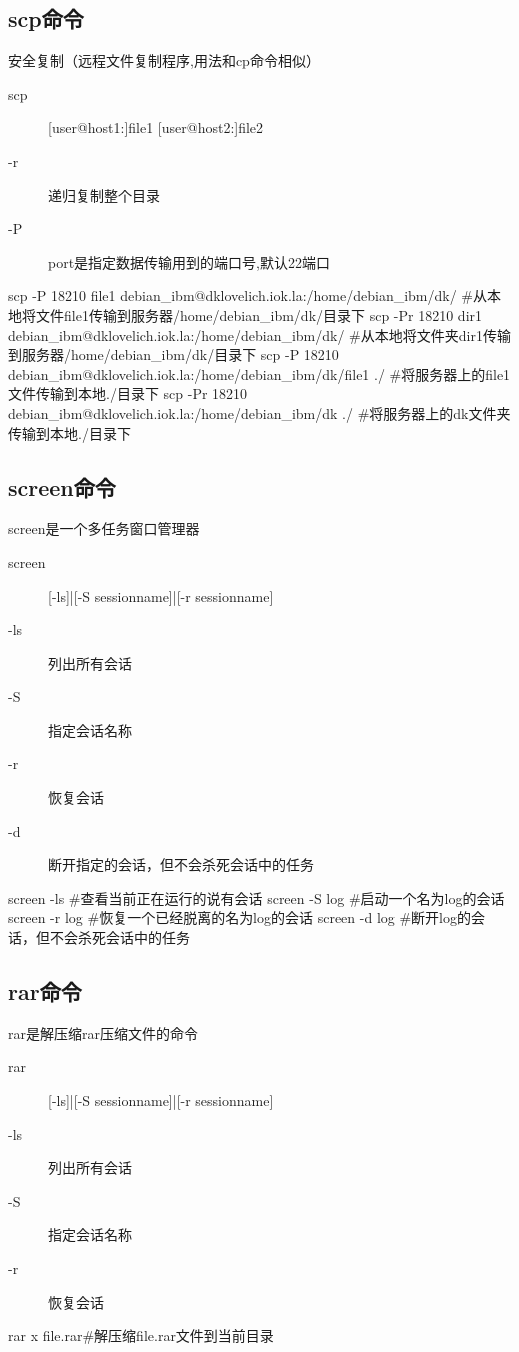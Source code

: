 \subsection{scp命令}
	安全复制（远程文件复制程序,用法和cp命令相似）
	\begin{description}
		\item[scp] [user@host1:]file1 [user@host2:]file2
		\item[-r] 递归复制整个目录
		\item[-P] port是指定数据传输用到的端口号,默认22端口
	\end{description}
\begin{shell}
scp -P 18210 file1 debian_ibm@dklovelich.iok.la:/home/debian_ibm/dk/ #从本地将文件file1传输到服务器/home/debian_ibm/dk/目录下
scp -Pr 18210 dir1 debian_ibm@dklovelich.iok.la:/home/debian_ibm/dk/ #从本地将文件夹dir1传输到服务器/home/debian_ibm/dk/目录下
scp -P 18210 debian_ibm@dklovelich.iok.la:/home/debian_ibm/dk/file1 ./ #将服务器上的file1文件传输到本地./目录下
scp -Pr 18210 debian_ibm@dklovelich.iok.la:/home/debian_ibm/dk ./ #将服务器上的dk文件夹传输到本地./目录下
\end{shell}
\subsection{screen命令}
	screen是一个多任务窗口管理器
	\begin{description}
		\item[screen] [-ls]|[-S sessionname]|[-r sessionname]
		\item[-ls] 列出所有会话
		\item[-S] 指定会话名称
		\item[-r] 恢复会话
		\item[-d] 断开指定的会话，但不会杀死会话中的任务
	\end{description}
\begin{shell}
screen -ls #查看当前正在运行的说有会话
screen -S log #启动一个名为log的会话
screen -r log #恢复一个已经脱离的名为log的会话
screen -d log #断开log的会话，但不会杀死会话中的任务
\end{shell}
\subsection{rar命令}
	rar是解压缩rar压缩文件的命令
	\begin{description}
		\item[rar] [-ls]|[-S sessionname]|[-r sessionname]
		\item[-ls] 列出所有会话
		\item[-S] 指定会话名称
		\item[-r] 恢复会话
	\end{description}
\begin{shell}
rar x file.rar#解压缩file.rar文件到当前目录
\end{shell}
